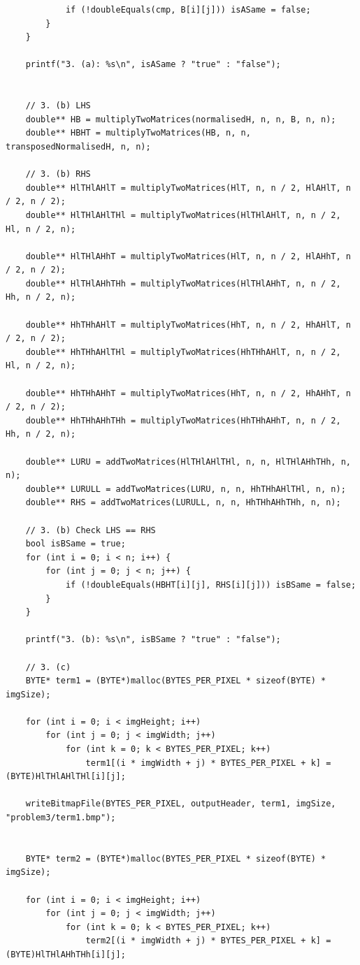 \begin{verbatim}
            if (!doubleEquals(cmp, B[i][j])) isASame = false;
        }
    }

    printf("3. (a): %s\n", isASame ? "true" : "false");


    // 3. (b) LHS
    double** HB = multiplyTwoMatrices(normalisedH, n, n, B, n, n);
    double** HBHT = multiplyTwoMatrices(HB, n, n, transposedNormalisedH, n, n);

    // 3. (b) RHS
    double** HlTHlAHlT = multiplyTwoMatrices(HlT, n, n / 2, HlAHlT, n / 2, n / 2);
    double** HlTHlAHlTHl = multiplyTwoMatrices(HlTHlAHlT, n, n / 2, Hl, n / 2, n);

    double** HlTHlAHhT = multiplyTwoMatrices(HlT, n, n / 2, HlAHhT, n / 2, n / 2);
    double** HlTHlAHhTHh = multiplyTwoMatrices(HlTHlAHhT, n, n / 2, Hh, n / 2, n);

    double** HhTHhAHlT = multiplyTwoMatrices(HhT, n, n / 2, HhAHlT, n / 2, n / 2);
    double** HhTHhAHlTHl = multiplyTwoMatrices(HhTHhAHlT, n, n / 2, Hl, n / 2, n);

    double** HhTHhAHhT = multiplyTwoMatrices(HhT, n, n / 2, HhAHhT, n / 2, n / 2);
    double** HhTHhAHhTHh = multiplyTwoMatrices(HhTHhAHhT, n, n / 2, Hh, n / 2, n);

    double** LURU = addTwoMatrices(HlTHlAHlTHl, n, n, HlTHlAHhTHh, n, n);
    double** LURULL = addTwoMatrices(LURU, n, n, HhTHhAHlTHl, n, n);
    double** RHS = addTwoMatrices(LURULL, n, n, HhTHhAHhTHh, n, n);

    // 3. (b) Check LHS == RHS
    bool isBSame = true;
    for (int i = 0; i < n; i++) {
        for (int j = 0; j < n; j++) {
            if (!doubleEquals(HBHT[i][j], RHS[i][j])) isBSame = false;
        }
    }

    printf("3. (b): %s\n", isBSame ? "true" : "false");

    // 3. (c)
    BYTE* term1 = (BYTE*)malloc(BYTES_PER_PIXEL * sizeof(BYTE) * imgSize);
    
    for (int i = 0; i < imgHeight; i++)
        for (int j = 0; j < imgWidth; j++)
            for (int k = 0; k < BYTES_PER_PIXEL; k++)
                term1[(i * imgWidth + j) * BYTES_PER_PIXEL + k] = (BYTE)HlTHlAHlTHl[i][j];

    writeBitmapFile(BYTES_PER_PIXEL, outputHeader, term1, imgSize, "problem3/term1.bmp");


    BYTE* term2 = (BYTE*)malloc(BYTES_PER_PIXEL * sizeof(BYTE) * imgSize);

    for (int i = 0; i < imgHeight; i++)
        for (int j = 0; j < imgWidth; j++)
            for (int k = 0; k < BYTES_PER_PIXEL; k++)
                term2[(i * imgWidth + j) * BYTES_PER_PIXEL + k] = (BYTE)HlTHlAHhTHh[i][j];


\end{verbatim}
